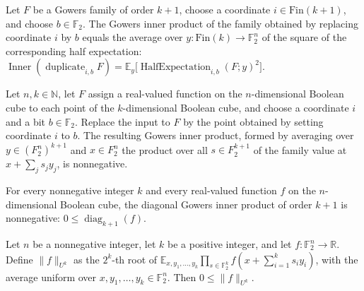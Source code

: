 \begin{theorem}
\label{FABL.gowersInner_duplicateAt}
\leanok
{}
Let $F$ be a Gowers family of order $k+1$, choose a coordinate $i\in\mathrm{Fin}(k+1)$,
and choose $b\in\mathbb F_2$. The Gowers inner product of the family obtained by
replacing coordinate $i$ by $b$ equals the average over $y:\mathrm{Fin}(k)\to\mathbb
F_2^n$ of the square of the corresponding half expectation:
$\operatorname{Inner}(\operatorname{duplicate}_{i,b}F)=\mathbb
E_y\bigl[\operatorname{HalfExpectation}_{i,b}(F;y)^2\bigr]$.
\end{theorem}

\begin{theorem}
\label{FABL.gowersInner_duplicateAt_nonneg}
\leanok
{}
Let $n,k\in\mathbb N$, let $F$ assign a real-valued function on the $n$-dimensional
Boolean cube to each point of the $k$-dimensional Boolean cube, and choose a coordinate
$i$ and a bit $b\in\mathbb F_2$. Replace the input to $F$ by the point obtained by
setting coordinate $i$ to $b$. The resulting Gowers inner product, formed by averaging
over $y\in(F_2^n)^{k+1}$ and $x\in F_2^n$ the product over all $s\in F_2^{k+1}$ of the
family value at $x+\sum_j s_jy_j$, is nonnegative.
\end{theorem}

\begin{theorem}
\label{FABL.gowersDiagonalInner_nonneg}
\leanok
{}
For every nonnegative integer $k$ and every real-valued function $f$ on the
$n$-dimensional Boolean cube, the diagonal Gowers inner product of order $k+1$ is
nonnegative: $0\leq\operatorname{diag}_{k+1}(f)$.
\end{theorem}

\begin{theorem}
\label{FABL.gowersNorm_nonneg}
\leanok
{}
Let $n$ be a nonnegative integer, let $k$ be a positive integer, and let $f\colon\mathbb
F_2^n\to\mathbb R$. Define $\|f\|_{U^k}$ as the $2^k$-th root of $\mathbb
E_{x,y_1,\ldots,y_k}\prod_{s\in\mathbb F_2^k}f(x+\sum_{i=1}^k s_i y_i)$, with the
average uniform over $x,y_1,\ldots,y_k\in\mathbb F_2^n$. Then $0\leq\|f\|_{U^k}$.
\end{theorem}

